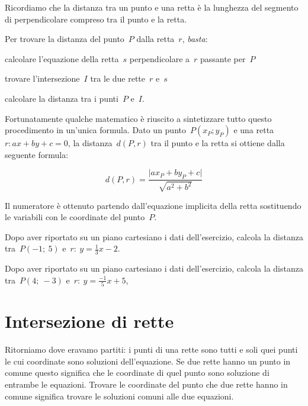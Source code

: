 Ricordiamo che la distanza tra un punto e una retta è la lunghezza del 
segmento di perpendicolare compreso tra il punto e la retta.


\begin{procedura}
 Per trovare la distanza del punto~\(P\) dalla retta~\(r\), \emph{basta}:
 \begin{enumeratea}
  \item calcolare l'equazione della retta~\(s\) perpendicolare a~\(r\) passante 
   per~\(P\)
  \item trovare l'intersezione~\(I\) tra le due rette~\(r\) e~\(s\)
  \item calcolare la distanza tra i punti~\(P\) e~\(I\).
 \end{enumeratea}
\end{procedura}

Fortunatamente qualche matematico è riuscito a sintetizzare tutto questo 
procedimento in un'unica formula. 
Dato un punto~\(P(x_P; y_P)\) e 
una retta~\(r: ax+by+c=0\),
la distanza~\(d(P, r)\) tra il punto e la retta si ottiene
dalla seguente formula:

\[d(P, r) = \frac{\lvert ax_P +by_P + c\rvert}{\sqrt{a^2 + b^2}}\]

Il numeratore è ottenuto partendo dall'equazione implicita della retta 
sostituendo le variabili con le coordinate del punto~\(P\).

\begin{exrig}
 \begin{esempio}
  Dopo aver riportato su un piano cartesiano i dati dell'esercizio,
  calcola la distanza tra~\(P(-1;~5)\) e~\(r:~y = \frac{1}{3} x -2\). 
 \end{esempio}
 \begin{esempio}
  Dopo aver riportato su un piano cartesiano i dati dell'esercizio,
  calcola la distanza tra~\(P(4;~-3)\) e~\(r:~y = \frac{-1}{5} x +5\),
 \end{esempio}
\end{exrig}

\section{Intersezione di rette}
\label{sec:retta_intersezionedirette}

Ritorniamo dove eravamo partiti: i punti di una rette sono tutti e soli quei 
punti le cui coordinate sono soluzioni dell'equazione. Se due rette hanno un 
punto in comune questo significa che le coordinate di quel punto sono 
soluzione di entrambe le equazioni. Trovare le coordinate del punto che due 
rette hanno in comune significa trovare le soluzioni comuni alle due equazioni.

